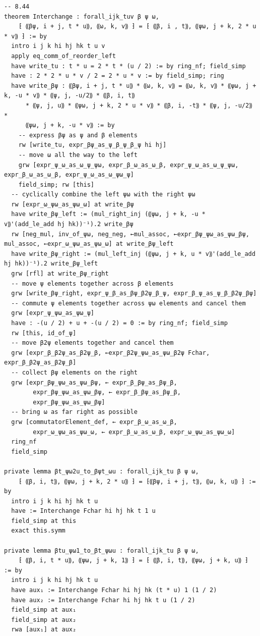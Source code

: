 \documentclass[10pt,a4paper]{article}
\begin{document}
\begin{Verbatim}
-- 8.44
theorem Interchange : forall_ijk_tuv β ψ ω,
    ⁅ ⸨βψ, i + j, t * u⸩, ⸨ω, k, v⸩ ⁆ = ⁅ ⸨β, i , t⸩, ⸨ψω, j + k, 2 * u * v⸩ ⁆ := by
  intro i j k hi hj hk t u v
  apply eq_comm_of_reorder_left
  have write_tu : t * u = 2 * t * (u / 2) := by ring_nf; field_simp
  have : 2 * 2 * u * v / 2 = 2 * u * v := by field_simp; ring
  have write_βψ : ⸨βψ, i + j, t * u⸩ * ⸨ω, k, v⸩ = ⸨ω, k, v⸩ * ⸨ψω, j + k, -u * v⸩ * ⸨ψ, j, -u/2⸩ * ⸨β, i, t⸩
      * ⸨ψ, j, u⸩ * ⸨ψω, j + k, 2 * u * v⸩ * ⸨β, i, -t⸩ * ⸨ψ, j, -u/2⸩ *
      ⸨ψω, j + k, -u * v⸩ := by
    -- express βψ as ψ and β elements
    rw [write_tu, expr_βψ_as_ψ_β_ψ_β_ψ hi hj]
    -- move ω all the way to the left
    grw [expr_ψ_ω_as_ω_ψ_ψω, expr_β_ω_as_ω_β, expr_ψ_ω_as_ω_ψ_ψω, expr_β_ω_as_ω_β, expr_ψ_ω_as_ω_ψω_ψ]
    field_simp; rw [this]
  -- cyclically combine the left ψω with the right ψω
  rw [expr_ω_ψω_as_ψω_ω] at write_βψ
  have write_βψ_left := (mul_right_inj (⸨ψω, j + k, -u * v⸩'(add_le_add hj hk))⁻¹).2 write_βψ
  rw [neg_mul, inv_of_ψω, neg_neg, ←mul_assoc, ←expr_βψ_ψω_as_ψω_βψ, mul_assoc, ←expr_ω_ψω_as_ψω_ω] at write_βψ_left
  have write_βψ_right := (mul_left_inj (⸨ψω, j + k, u * v⸩'(add_le_add hj hk))⁻¹).2 write_βψ_left
  grw [rfl] at write_βψ_right
  -- move ψ elements together across β elements
  grw [write_βψ_right, expr_ψ_β_as_βψ_β2ψ_β_ψ, expr_β_ψ_as_ψ_β_β2ψ_βψ]
  -- commute ψ elements together across ψω elements and cancel them
  grw [expr_ψ_ψω_as_ψω_ψ]
  have : -(u / 2) + u + -(u / 2) = 0 := by ring_nf; field_simp
  rw [this, id_of_ψ]
  -- move β2ψ elements together and cancel them
  grw [expr_β_β2ψ_as_β2ψ_β, ←expr_β2ψ_ψω_as_ψω_β2ψ Fchar, expr_β_β2ψ_as_β2ψ_β]
  -- collect βψ elements on the right
  grw [expr_βψ_ψω_as_ψω_βψ, ← expr_β_βψ_as_βψ_β,
        expr_βψ_ψω_as_ψω_βψ, ← expr_β_βψ_as_βψ_β,
        expr_βψ_ψω_as_ψω_βψ]
  -- bring ω as far right as possible
  grw [commutatorElement_def, ← expr_β_ω_as_ω_β,
        expr_ω_ψω_as_ψω_ω, ← expr_β_ω_as_ω_β, expr_ω_ψω_as_ψω_ω]
  ring_nf
  field_simp

private lemma βt_ψω2u_to_βψt_ωu : forall_ijk_tu β ψ ω,
    ⁅ ⸨β, i, t⸩, ⸨ψω, j + k, 2 * u⸩ ⁆ = ⁅⸨βψ, i + j, t⸩, ⸨ω, k, u⸩ ⁆ := by
  intro i j k hi hj hk t u
  have := Interchange Fchar hi hj hk t 1 u
  field_simp at this
  exact this.symm

private lemma βtu_ψω1_to_βt_ψωu : forall_ijk_tu β ψ ω,
    ⁅ ⸨β, i, t * u⸩, ⸨ψω, j + k, 1⸩ ⁆ = ⁅ ⸨β, i, t⸩, ⸨ψω, j + k, u⸩ ⁆ := by
  intro i j k hi hj hk t u
  have aux₁ := Interchange Fchar hi hj hk (t * u) 1 (1 / 2)
  have aux₂ := Interchange Fchar hi hj hk t u (1 / 2)
  field_simp at aux₁
  field_simp at aux₂
  rwa [aux₁] at aux₂


\end{Verbatim}
\end{document}
